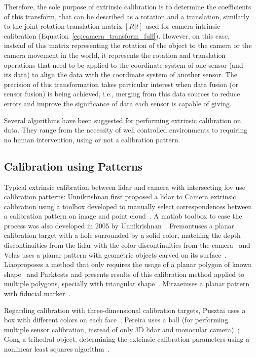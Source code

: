 Therefore, the sole purpose of extrinsic calibration is to determine the coefficients of this transform, that can be described as a rotation and a translation, similarly to the joint rotation-translation matrix $[R|t]$ used for camera intrinsic calibration (Equation~\eqref{eq:camera_transform_full}). However, on this case, instead of this matrix representing the rotation of the object to the camera or the camera movement in the world, it represents the rotation and translation operations that need to be applied to the coordinate system of one sensor (and its data) to align the data with the coordinate system of another sensor. The precision of this transformation takes particular interest when data fusion (or sensor fusion) is being achieved, i.e., merging from this data sources to reduce errors and improve the significance of data each sensor is capable of giving. 

Several algorithms have been suggested for performing extrinsic calibration on data. They range from the necessity of well controlled environments to requiring no human intervention, using or not a calibration pattern. 


\subsection{Calibration using Patterns}
Typical extrinsic calibration between \ac{lidar} and camera with intersecting \ac{fov} use calibration patterns: Unnikrishnan first proposed a \ac{lidar} to Camera extrinsic calibration using a toolbox developed to manually select correspondences between a calibration pattern on image and point cloud~\cite{Unnikrishnan2005}. A \ac{matlab} toolbox to ease the process was also developed in 2005 by Unnikrishnan\etal~\cite{Unnikrishnan}. Fremont\etal uses a planar calibration target with a hole surrounded by a solid color, matching the depth discontinuities from the \ac{lidar} with the color discontinuities from the camera~\cite{Fremont2013} and Velas uses a planar pattern with geometric objects carved on its surface~\cite{MartinVelas2013}. Liao\etal proposes a method that only requires the usage of a planar polygon of known shape~\cite{Liao2019} and Park\etal tests and presents results of this calibration method applied to multiple polygons, specially with triangular shape~\cite{Park2014}. Mirzaei\etal uses a planar pattern with fiducial marker~\cite{Mirzaei2012}. 

Regarding calibration with three-dimensional calibration targets, Pusztai uses a box with different colors on each face~\cite{Pusztai2018}; Pereira uses a ball (for performing multiple sensor calibration, instead of only 3D \ac{lidar} and monocular camera)~\cite{Pereira2016}; Gong a trihedral object, determining the extrinsic calibration parameters using a nonlinear least squares algorithm~\cite{Gong2013}.

